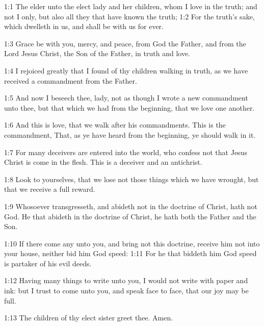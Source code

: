 

1:1 The elder unto the elect lady and her children, whom I love in
the truth; and not I only, but also all they that have known the
truth; 1:2 For the truth's sake, which dwelleth in us, and shall be
with us for ever.

1:3 Grace be with you, mercy, and peace, from God the Father, and from
the Lord Jesus Christ, the Son of the Father, in truth and love.

1:4 I rejoiced greatly that I found of thy children walking in truth,
as we have received a commandment from the Father.

1:5 And now I beseech thee, lady, not as though I wrote a new
commandment unto thee, but that which we had from the beginning, that
we love one another.

1:6 And this is love, that we walk after his commandments. This is the
commandment, That, as ye have heard from the beginning, ye should walk
in it.

1:7 For many deceivers are entered into the world, who confess not
that Jesus Christ is come in the flesh. This is a deceiver and an
antichrist.

1:8 Look to yourselves, that we lose not those things which we have
wrought, but that we receive a full reward.

1:9 Whosoever transgresseth, and abideth not in the doctrine of
Christ, hath not God. He that abideth in the doctrine of Christ, he
hath both the Father and the Son.

1:10 If there come any unto you, and bring not this doctrine, receive
him not into your house, neither bid him God speed: 1:11 For he that
biddeth him God speed is partaker of his evil deeds.

1:12 Having many things to write unto you, I would not write with
paper and ink: but I trust to come unto you, and speak face to face,
that our joy may be full.

1:13 The children of thy elect sister greet thee. Amen.

